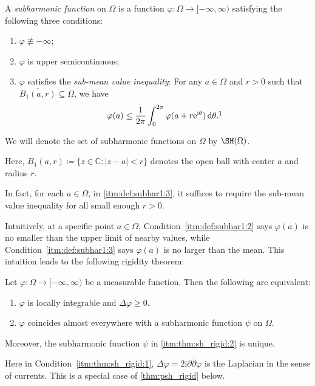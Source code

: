 \begin{definition}\label{def:subhar1}
    A \emph{subharmonic function}  on $\Omega$ is a function $\varphi\colon \Omega\rightarrow [-\infty,\infty)$ satisfying the following three conditions:
    \begin{enumerate}
        \item\label{itm:def:subhar1:1} $\varphi\not\equiv -\infty$;
        \item\label{itm:def:subhar1:2} $\varphi$ is upper semicontinuous;
        \item\label{itm:def:subhar1:3} $\varphi$ satisfies the \emph{sub-mean value inequality}: For any $a\in \Omega$ and $r>0$ such that $\overline{B_1(a,r)}\subseteq \Omega$, we have
        \[
        \varphi(a)\leq \frac{1}{2\pi}\int_0^{2\pi} \varphi(a+r\mathrm{e}^{\mathrm{i}\theta})\,\mathrm{d}\theta.\footnotemark
        \]
    \end{enumerate}

    We will denote the set of subharmonic functions on $\Omega$ by $\SH(\Omega)$\index{$\SH(\Omega)$}.
\end{definition}
Here, $B_1(a,r)\coloneqq \{z\in \mathbb{C}:|z-a|<r\}$ denotes the open ball with center $a$ and radius $r$.

In fact, for each $a\in \Omega$, in \ref{itm:def:subhar1:3}, it suffices to require the sub-mean value inequality for all small enough $r>0$.

Intuitively, at a specific point $a\in \Omega$, Condition~\ref{itm:def:subhar1:2} says $\varphi(a)$ is no smaller than the upper limit of nearby values, while Condition~\ref{itm:def:subhar1:3} says $\varphi(a)$ is no larger than the mean. This intuition leads to the following rigidity theorem:
\begin{theorem}\label{thm:sh_rigid}
    Let $\varphi\colon \Omega\rightarrow [-\infty,\infty)$ be a measurable function. Then the following are equivalent:
    \begin{enumerate}
        \item\label{itm:thm:sh_rigid:1} $\varphi$ is locally integrable and $\Delta\varphi\geq 0$.
        \item\label{itm:thm:sh_rigid:2} $\varphi$ coincides almost everywhere with a subharmonic function $\psi$ on $\Omega$.
    \end{enumerate}
    Moreover, the subharmonic function $\psi$ in \ref{itm:thm:sh_rigid:2} is unique.
\end{theorem}
Here in Condition~\ref{itm:thm:sh_rigid:1}, $\Delta\varphi=2\mathrm{i}\partial\bar\partial\varphi$ is the Laplacian in the sense of currents. This is a special case of \cref{thm:psh_rigid} below.


